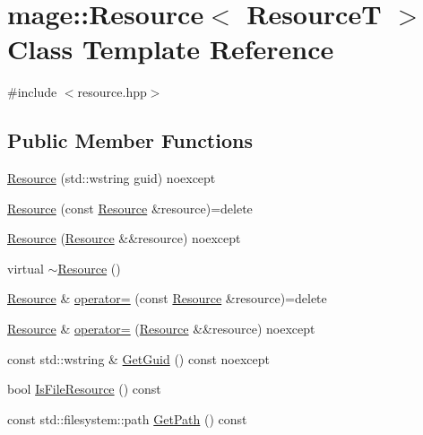 \hypertarget{classmage_1_1_resource}{}\section{mage\+:\+:Resource$<$ ResourceT $>$ Class Template Reference}
\label{classmage_1_1_resource}


{\ttfamily \#include $<$resource.\+hpp$>$}

\subsection*{Public Member Functions}
\begin{DoxyCompactItemize}
\item 
\mbox{\hyperlink{classmage_1_1_resource_a10fbd756dae89a3ea9ba13a40c631238}{Resource}} (std\+::wstring guid) noexcept
\item 
\mbox{\hyperlink{classmage_1_1_resource_a53da586d9bae285ab50c4cca2421a9ce}{Resource}} (const \mbox{\hyperlink{classmage_1_1_resource}{Resource}} \&resource)=delete
\item 
\mbox{\hyperlink{classmage_1_1_resource_adfff024cb267644156ba1b357d6f8d10}{Resource}} (\mbox{\hyperlink{classmage_1_1_resource}{Resource}} \&\&resource) noexcept
\item 
virtual \mbox{\hyperlink{classmage_1_1_resource_a56a3ac799224e100b271b65ec455b59e}{$\sim$\+Resource}} ()
\item 
\mbox{\hyperlink{classmage_1_1_resource}{Resource}} \& \mbox{\hyperlink{classmage_1_1_resource_a938159cb02ec565b9b957f993db4769d}{operator=}} (const \mbox{\hyperlink{classmage_1_1_resource}{Resource}} \&resource)=delete
\item 
\mbox{\hyperlink{classmage_1_1_resource}{Resource}} \& \mbox{\hyperlink{classmage_1_1_resource_aa1f7a7ddd31f4fc16293b4a5ca9a93c8}{operator=}} (\mbox{\hyperlink{classmage_1_1_resource}{Resource}} \&\&resource) noexcept
\item 
const std\+::wstring \& \mbox{\hyperlink{classmage_1_1_resource_a6b954ea75373227ce82b5a59d51aaa9d}{Get\+Guid}} () const noexcept
\item 
bool \mbox{\hyperlink{classmage_1_1_resource_ae783140e30a974c8820e5ae8be9e4b44}{Is\+File\+Resource}} () const
\item 
const std\+::filesystem\+::path \mbox{\hyperlink{classmage_1_1_resource_a7611d0317a247d324d432b26aab6aee2}{Get\+Path}} () const
\end{DoxyCompactItemize}
